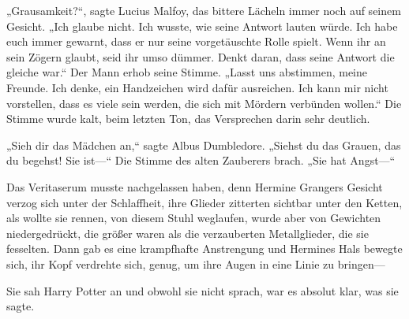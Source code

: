 „Grausamkeit?“, sagte Lucius Malfoy, das bittere Lächeln immer noch auf seinem Gesicht. „Ich glaube nicht. Ich wusste, wie seine Antwort lauten würde. Ich habe euch immer gewarnt, dass er nur seine vorgetäuschte Rolle spielt. Wenn ihr an sein Zögern glaubt, seid ihr umso dümmer. Denkt daran, dass seine Antwort die gleiche war.“
Der Mann erhob seine Stimme.
„Lasst uns abstimmen, meine Freunde. Ich denke, ein Handzeichen wird dafür ausreichen. Ich kann mir nicht vorstellen, dass es viele sein werden, die sich mit Mördern verbünden wollen.“
Die Stimme wurde kalt, beim letzten Ton, das Versprechen darin sehr deutlich.

„Sieh dir das Mädchen an,“ sagte Albus Dumbledore. „Siehst du das Grauen, das du begehst! Sie ist—“ Die Stimme des alten Zauberers brach. „Sie hat Angst—“

Das Veritaserum musste nachgelassen haben, denn Hermine Grangers Gesicht verzog sich unter der Schlaffheit, ihre Glieder zitterten sichtbar unter den Ketten, als wollte sie rennen, von diesem Stuhl weglaufen, wurde aber von Gewichten niedergedrückt, die größer waren als die verzauberten Metallglieder, die sie fesselten. Dann gab es eine krampfhafte Anstrengung und Hermines Hals bewegte sich, ihr Kopf verdrehte sich, genug, um ihre Augen in eine Linie zu bringen—

Sie sah Harry Potter an und obwohl sie nicht sprach, war es absolut klar, was sie sagte.

